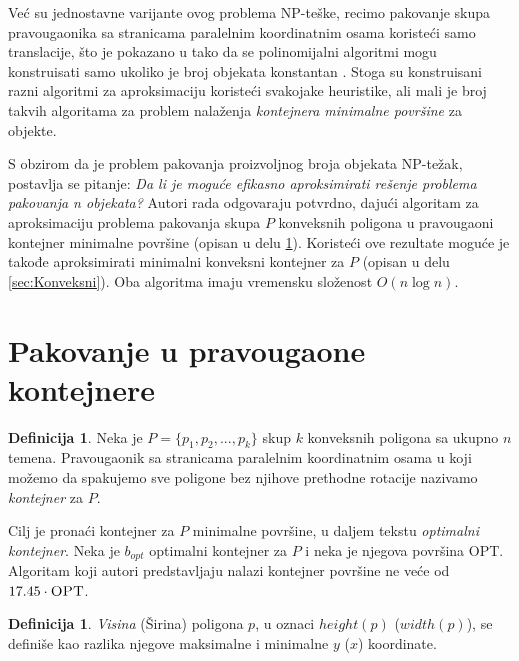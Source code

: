 \documentclass[a4paper]{article}
\theoremstyle{plain}
\theoremstyle{definition}
\newtheorem{defn}[thm]{Definicija} %
\begin{document}
Ve\'c{} su jednostavne varijante ovog problema NP-te\v{s}ke, recimo pakovanje skupa pravougaonika sa stranicama paralelnim koordinatnim osama koriste\'c{}i samo translacije, \v{s}to je pokazano u \cite{OptimalPackingInPlane} tako da se polinomijalni algoritmi mogu konstruisati samo ukoliko je broj objekata konstantan \cite{BuildingThreeConvexPolygons, AligningTwoConvexFigures}. Stoga su konstruisani razni algoritmi za aproksimaciju koriste\'c{}i svakojake heuristike, ali mali je broj takvih algoritama za problem nala\v{z}enja \emph{kontejnera minimalne povr\v{s}ine} za objekte. 

S obzirom da je problem pakovanja proizvoljnog broja objekata NP-te\v{z}ak, postavlja se pitanje: \emph{Da li je mogu\'c{}e efikasno aproksimirati re\v{s}enje problema pakovanja n objekata?} Autori rada odgovaraju potvrdno, daju\'c{}i algoritam za aproksimaciju problema pakovanja skupa $P$ konveksnih poligona u pravougaoni kontejner minimalne povr\v{s}ine (opisan u delu \ref{sec:Pravougaoni}). Koriste\'c{}i ove rezultate mogu\'c{}e je takođe aproksimirati minimalni konveksni kontejner za $P$ (opisan u delu \ref{sec:Konveksni}). Oba algoritma imaju vremensku slo\v{z}enost $O(n\log{}n)$.


\section{Pakovanje u pravougaone kontejnere}
\label{sec:Pravougaoni}

\begin{defn}
    Neka je $P = \{ p_{1}, p_{2}, ... , p_{k} \}$ skup $k$ konveksnih poligona sa ukupno $n$ temena. Pravougaonik sa stranicama paralelnim koordinatnim osama u koji mo\v{z}emo da spakujemo sve poligone bez njihove prethodne rotacije nazivamo \emph{kontejner} za $P$.
\end{defn}

Cilj je prona\'c{}i kontejner za $P$ minimalne povr\v{s}ine, u daljem tekstu \emph{optimalni kontejner}. Neka je $b_{opt}$ optimalni kontejner za $P$ i neka je njegova povr\v{s}ina \textsc{OPT}. Algoritam koji autori predstavljaju nalazi kontejner povr\v{s}ine ne ve\'c{}e od $17.45 \cdot \textsc{OPT}$.

\begin{defn}
    \emph{Visina} (\v{Sirina}) poligona $p$, u oznaci \emph{$height(p)$} (\emph{$width(p)$}), se defini\v{s}e kao razlika njegove maksimalne i minimalne $y$ ($x$) koordinate.
\end{defn}
\end{document}
